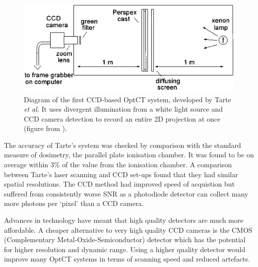 \documentclass[12pt]{article}
\begin{document}
\begin{figure}[H]
\centering
\includegraphics[scale=0.4]{Tarte_1997_ccdsetup.jpg}
\caption{Diagram of the first CCD-based  OptCT system, developed by Tarte \textit{et al.} It uses  divergent illumination from a white light source and CCD camera detection to record an entire 2D projection at once   (figure from \cite{Tarte:2007}). }
\label{fig:tarte_ccd_setup}
\end{figure}


The accuracy of Tarte's system  was checked by comparison with the standard measure of dosimetry, the parallel plate ionisation chamber. It was found to be on average within 3\% of the value from the ionisation chamber. \cite{Tarte:2007} A comparison between Tarte's laser scanning and CCD set-ups found that they had similar spatial resolutions. The CCD method had improved speed of acquistion but suffered from consistently worse SNR as a photodiode detector can collect many more photons per `pixel' than a CCD camera. \cite{Tarte:2007}


Advances in technology have meant that  high quality detectors are much more affordable. A cheaper alternative to very high quality CCD cameras is the CMOS (Complementary Metal-Oxide-Semiconductor) detector which has the potential for higher resolution and dynamic range. \cite{Doran:2008kh} Using a higher quality detector would improve many OptCT systems  in terms of scanning speed and reduced artefacts. \cite{Tarte:2007, Doran:2001ee}
\end{document}
